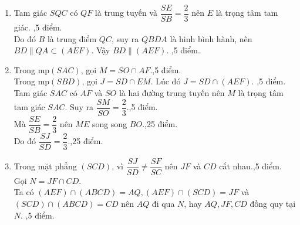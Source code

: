 \begin{ex}
{\begin{enumerate}
			\item Tam giác $SQC$ có $QF$ là trung tuyến và $\dfrac{SE}{SB}=\dfrac{2}{3}$ nên $E$ là trọng tâm tam giác. ,5 điểm.\\
			Do đó $B$ là trung điểm $QC$, suy ra $QBDA$ là hình bình hành, nên $BD\parallel QA\subset (AEF)$. Vậy $BD\parallel (AEF)$. ,5 điểm.
			\item Trong mp$(SAC)$, gọi $M=SO\cap AF$.,5 điểm.\\
			Trong mp$(SBD)$, gọi $J=SD\cap EM$. Lúc đó $J=SD\cap (AEF)$. ,5 điểm.\\
			Tam giác $SAC$ có $AF$ và $SO$ là hai đường trung tuyến nên $M$ là trọng tâm tam giác $SAC$. Suy ra $\dfrac{SM}{SO}=\dfrac{2}{3}$.,5 điểm.\\
			Mà $\dfrac{SE}{SB}=\dfrac{2}{3}$ nên $ME$ song song $BO$.,25 điểm.\\
			Do đó $\dfrac{SJ}{SD}=\dfrac{2}{3}$.,25 điểm.
			\item Trong mặt phẳng $(SCD)$, vì $\dfrac{SJ}{SD}\neq \dfrac{SF}{SC}$ nên $JF$ và $CD$ cắt nhau.,5 điểm.\\
			Gọi $N=JF\cap CD$.\\
			Ta có $(AEF)\cap (ABCD)=AQ, (AEF)\cap (SCD)=JF$ và $(SCD) \cap (ABCD)=CD$ nên $AQ$ đi qua $N$, hay $AQ, JF, CD$ đồng quy tại $N$. ,5 điểm.
		\end{enumerate}
	}
\end{ex}

